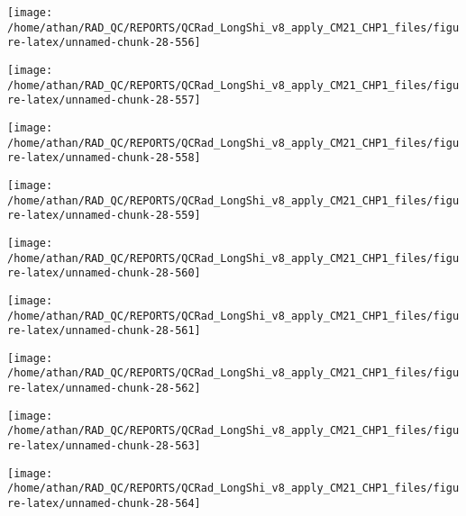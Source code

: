 \documentclass[
  10pt,
  a4paper,oneside]{article}
\begin{document}
\begin{center}\texttt{[image: /home/athan/RAD\_QC/REPORTS/QCRad\_LongShi\_v8\_apply\_CM21\_CHP1\_files/figure-latex/unnamed-chunk-28-556]} \end{center}

\begin{center}\texttt{[image: /home/athan/RAD\_QC/REPORTS/QCRad\_LongShi\_v8\_apply\_CM21\_CHP1\_files/figure-latex/unnamed-chunk-28-557]} \end{center}

\begin{center}\texttt{[image: /home/athan/RAD\_QC/REPORTS/QCRad\_LongShi\_v8\_apply\_CM21\_CHP1\_files/figure-latex/unnamed-chunk-28-558]} \end{center}

\begin{center}\texttt{[image: /home/athan/RAD\_QC/REPORTS/QCRad\_LongShi\_v8\_apply\_CM21\_CHP1\_files/figure-latex/unnamed-chunk-28-559]} \end{center}

\begin{center}\texttt{[image: /home/athan/RAD\_QC/REPORTS/QCRad\_LongShi\_v8\_apply\_CM21\_CHP1\_files/figure-latex/unnamed-chunk-28-560]} \end{center}

\begin{center}\texttt{[image: /home/athan/RAD\_QC/REPORTS/QCRad\_LongShi\_v8\_apply\_CM21\_CHP1\_files/figure-latex/unnamed-chunk-28-561]} \end{center}

\begin{center}\texttt{[image: /home/athan/RAD\_QC/REPORTS/QCRad\_LongShi\_v8\_apply\_CM21\_CHP1\_files/figure-latex/unnamed-chunk-28-562]} \end{center}

\begin{center}\texttt{[image: /home/athan/RAD\_QC/REPORTS/QCRad\_LongShi\_v8\_apply\_CM21\_CHP1\_files/figure-latex/unnamed-chunk-28-563]} \end{center}

\begin{center}\texttt{[image: /home/athan/RAD\_QC/REPORTS/QCRad\_LongShi\_v8\_apply\_CM21\_CHP1\_files/figure-latex/unnamed-chunk-28-564]} \end{center}
\end{document}
